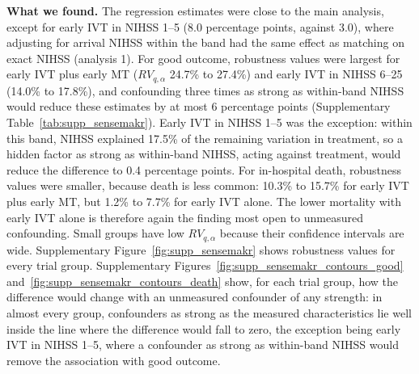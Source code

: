 \textbf{What we found.} The regression estimates were close to the main analysis, except for early IVT in NIHSS 1--5 (8.0 percentage points, against 3.0), where adjusting for arrival NIHSS within the band had the same effect as matching on exact NIHSS (analysis 1). For good outcome, robustness values were largest for early IVT plus early MT ($RV_{q,\alpha}$ 24.7\% to 27.4\%) and early IVT in NIHSS 6--25 (14.0\% to 17.8\%), and confounding three times as strong as within-band NIHSS would reduce these estimates by at most 6 percentage points (Supplementary Table~\ref{tab:supp_sensemakr}). Early IVT in NIHSS 1--5 was the exception: within this band, NIHSS explained 17.5\% of the remaining variation in treatment, so a hidden factor as strong as within-band NIHSS, acting against treatment, would reduce the difference to 0.4 percentage points. For in-hospital death, robustness values were smaller, because death is less common: 10.3\% to 15.7\% for early IVT plus early MT, but 1.2\% to 7.7\% for early IVT alone. The lower mortality with early IVT alone is therefore again the finding most open to unmeasured confounding. Small groups have low $RV_{q,\alpha}$ because their confidence intervals are wide. Supplementary Figure~\ref{fig:supp_sensemakr} shows robustness values for every trial group. Supplementary Figures~\ref{fig:supp_sensemakr_contours_good} and~\ref{fig:supp_sensemakr_contours_death} show, for each trial group, how the difference would change with an unmeasured confounder of any strength: in almost every group, confounders as strong as the measured characteristics lie well inside the line where the difference would fall to zero, the exception being early IVT in NIHSS 1--5, where a confounder as strong as within-band NIHSS would remove the association with good outcome.

